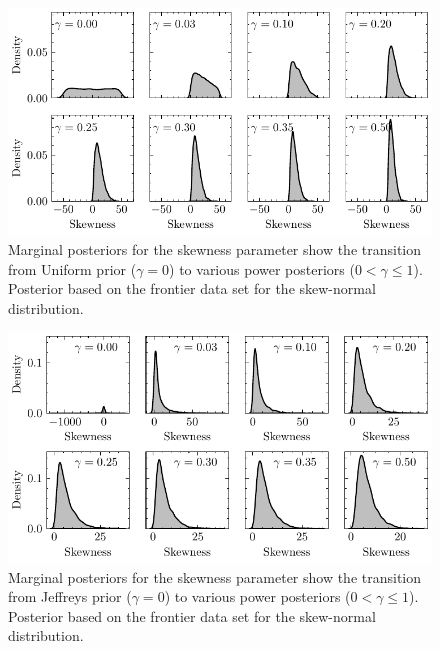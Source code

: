 \documentclass[12pt]{article}
\begin{document}
\begin{figure}
\begin{center}
\includegraphics{imgs/uniform_pow.pdf}
\end{center}
\caption{Marginal posteriors for the skewness parameter show the transition from Uniform prior ($\gamma=0$) to various power posteriors ($0<\gamma\leq1$).  Posterior based on the frontier data set for the skew-normal distribution.}\label{fig:skew_normal_powpos}
\end{figure}


\begin{figure}[h]
\begin{center}
\includegraphics{imgs/Jeffreys.pdf}
\end{center}
\caption{Marginal posteriors for the skewness parameter show the transition from Jeffreys prior ($\gamma=0$) to various power posteriors ($0<\gamma\leq1$).  Posterior based on the frontier data set for the skew-normal distribution. }\label{fig:skew_jeff_powpos}
\end{figure}
\end{document}

